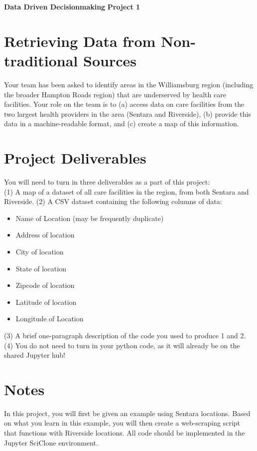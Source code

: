 \documentclass[a4paper, 11pt]{article}
\begin{document}
\noindent
\large\textbf{Data Driven Decisionmaking} \hfill \textbf{Project 1} \\

\section*{Retrieving Data from Non-traditional Sources}
Your team has been asked to identify areas in the Williamsburg region (including the broader Hampton Roads region) that are underserved by health care facilities.  Your role on the team is to (a) access data on  care facilities from the two largest health providers in the area (Sentara and Riverside), (b) provide this data in a machine-readable format, and (c) create a map of this information.

\section{Project Deliverables}
You will need to turn in three deliverables as a part of this project:\\
(1) A map of a dataset of all care facilities in the region, from both Sentara and Riverside.
(2) A CSV dataset containing the following columns of data: \\
\begin{itemize}
\item Name of Location (may be frequently duplicate)
\item Address of location
\item City of location
\item State of location
\item Zipcode of location
\item Latitude of location
\item Longitude of Location
\end{itemize}
(3) A brief one-paragraph description of the code you used to produce 1 and 2.\\
(4) You do not need to turn in your python code, as it will already be on the shared Jupyter hub!

\section{Notes}
In this project, you will first be given an example using Sentara locations.  Based on what you learn in this example, you will then create a web-scraping script that functions with Riverside locations.  All code should be implemented in the Jupyter SciClone environment.
\end{document}
